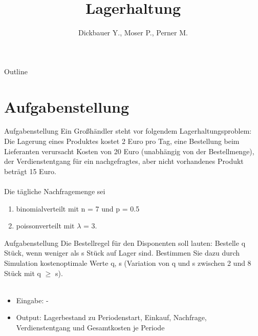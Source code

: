 

\title[BSP21 - Lagerhaltung]{Lagerhaltung}
\author{Dickbauer Y., Moser P., Perner M.}



\begin{frame}
  \titlepage
\end{frame}

\begin{frame}{Outline}
  \tableofcontents
\end{frame}

\section{Aufgabenstellung}
\begin{frame}{Aufgabenstellung}
Ein Großhändler steht vor folgendem Lagerhaltungsproblem: Die Lagerung eines Produktes
kostet 2 Euro pro Tag, eine Bestellung beim Lieferanten verursacht Kosten von
20 Euro (unabhängig von der Bestellmenge), der Verdienstentgang für ein nachgefragtes,
aber nicht vorhandenes Produkt beträgt 15 Euro.\\~\\
Die tägliche Nachfragemenge sei
\begin{enumerate}
\item binomialverteilt mit n = 7 und p = 0.5
\item poissonverteilt mit $\lambda$ = 3.
\end{enumerate}
\end{frame}

\begin{frame}{Aufgabenstellung}
Die Bestellregel für den Disponenten soll lauten: Bestelle q Stück, wenn weniger als s
Stück auf Lager sind. Bestimmen Sie dazu durch Simulation kostenoptimale Werte q, s
(Variation von q und s zwischen 2 und 8 Stück mit q $\geq$ s).\\~\\

\begin{itemize}
  \item Eingabe: -
  \item Output: Lagerbestand zu Periodenstart, Einkauf, Nachfrage, Verdienstentgang und
Gesamtkosten je Periode
\end{itemize}
\end{frame}

